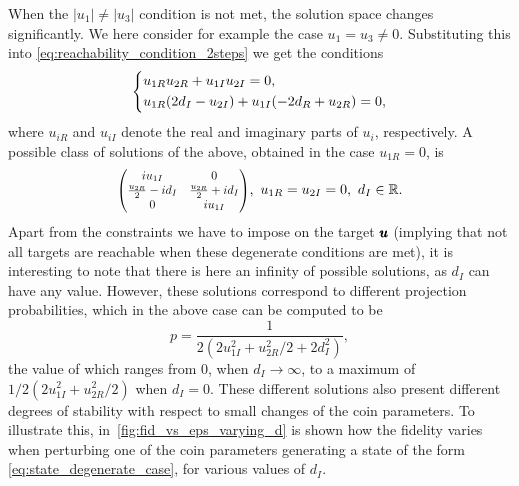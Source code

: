 When the $\lvert u_1 \rvert \neq \lvert u_3 \rvert$ condition is not met, the solution space changes significantly.
We here consider for example the case $u_1 = u_3 \neq 0$. Substituting this into \cref{eq:reachability_condition_2steps} we get the conditions
\begin{equation*}
	\begin{dcases}
		u_{1R}u_{2R} + u_{1I} u_{2I} = 0, \\
		u_{1R} (2d_I - u_{2I})
		+ u_{1I} (-2 d_R + u_{2R}) = 0,
	\end{dcases}
\end{equation*}
where $u_{iR}$ and $u_{iI}$ denote the real and imaginary parts of $u_i$, respectively.
A possible class of solutions of the above, obtained in the case $u_{1R} = 0$, is
\begin{equation}
	\scalemath{0.86}{
	\begin{pmatrix}
		i u_{1I} & 0 \\
		\frac{u_{2R}}{2}-i d_I & \frac{u_{2R}}{2} + i d_I \\
		0 & i u_{1I}
	\end{pmatrix}},\,\,
	u_{1R} = u_{2I} = 0,\,\, d_I \in \mathbb R.
	\label{eq:state_degenerate_case}
\end{equation}
Apart from the constraints we have to impose on the target $\pmb{u}$ (implying that not all targets are reachable when these degenerate conditions are met), it is interesting to note that there is here an infinity of possible solutions, as $d_I$ can have any value.
However, these solutions correspond to different projection probabilities, which in the above case can be computed to be
\begin{equation*}
	p = \frac{1}{2\left( 2 u_{1I}^2 + u_{2R}^2/2 + 2 d_I^2 \right)},
\end{equation*}
the value of which ranges from 0, when $d_I \to \infty$, to a maximum of $1/2(2u_{1I}^2 + u_{2R}^2 / 2)$ when $d_I = 0$.
These different solutions also present different degrees of stability with respect to small changes of the coin parameters.
To illustrate this, in~\cref{fig:fid_vs_eps_varying_d} is shown how the fidelity varies when perturbing one of the coin parameters generating a state of the form \cref{eq:state_degenerate_case}, for various values of $d_I$.

